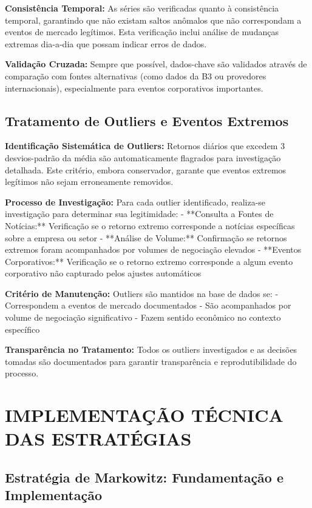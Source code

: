 \textbf{Consistência Temporal:} As séries são verificadas quanto à consistência temporal, garantindo que não existam saltos anômalos que não correspondam a eventos de mercado legítimos. Esta verificação inclui análise de mudanças extremas dia-a-dia que possam indicar erros de dados.

\textbf{Validação Cruzada:} Sempre que possível, dados-chave são validados através de comparação com fontes alternativas (como dados da B3 ou provedores internacionais), especialmente para eventos corporativos importantes.

\subsection{Tratamento de Outliers e Eventos Extremos}

\textbf{Identificação Sistemática de Outliers:} Retornos diários que excedem 3 desvios-padrão da média são automaticamente flagrados para investigação detalhada. Este critério, embora conservador, garante que eventos extremos legítimos não sejam erroneamente removidos.

\textbf{Processo de Investigação:} Para cada outlier identificado, realiza-se investigação para determinar sua legitimidade:
- **Consulta a Fontes de Notícias:** Verificação se o retorno extremo corresponde a notícias específicas sobre a empresa ou setor
- **Análise de Volume:** Confirmação se retornos extremos foram acompanhados por volumes de negociação elevados
- **Eventos Corporativos:** Verificação se o retorno extremo corresponde a algum evento corporativo não capturado pelos ajustes automáticos

\textbf{Critério de Manutenção:} Outliers são mantidos na base de dados se:
- Correspondem a eventos de mercado documentados
- São acompanhados por volume de negociação significativo
- Fazem sentido econômico no contexto específico

\textbf{Transparência no Tratamento:} Todos os outliers investigados e as decisões tomadas são documentados para garantir transparência e reprodutibilidade do processo.

\section{IMPLEMENTAÇÃO TÉCNICA DAS ESTRATÉGIAS}

\subsection{Estratégia de Markowitz: Fundamentação e Implementação}

